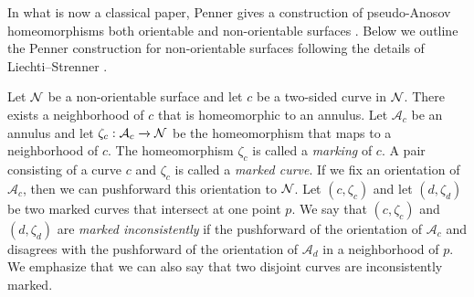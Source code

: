 In what is now a classical paper, Penner gives a construction of pseudo-Anosov homeomorphisms both orientable and non-orientable surfaces \cite{penner1988construction}.  Below we outline the Penner construction for non-orientable surfaces following the details of Liechti--Strenner \cite[Section 2]{LS}.

%

  Let $\mathcal{N}$ be a non-orientable surface and let $c$ be a two-sided curve in $\mathcal{N}$.  There exists a neighborhood of $c$ that is homeomorphic to an annulus.  Let $\mathcal{A}_c$ be an annulus and let $\zeta_c: \mathcal{A}_c \xrightarrow{} \mathcal{N}$ be the homeomorphism that maps to a neighborhood of $c$.  The homeomorphism $\zeta_c$ is called a \textit{marking} of $c$. A pair consisting of a curve $c$ and $\zeta_c$ is called a {\it marked curve}.  
 If we fix an
orientation of $\mathcal{A}_c$, then we can pushforward this orientation to $\mathcal{N}$. Let
$(c,\zeta_c)$ and let $(d,\zeta_d)$ be two marked curves that intersect at one point $p$.  We say that $(c,\zeta_c)$ and $(d,\zeta_d)$ are {\it marked inconsistently} if the
pushforward of the orientation of $\mathcal{A}_c$ and disagrees with the pushforward of the orientation of $\mathcal{A}_d$ in a neighborhood of $p$.  We emphasize that we can also say that two disjoint curves are inconsistently marked.

